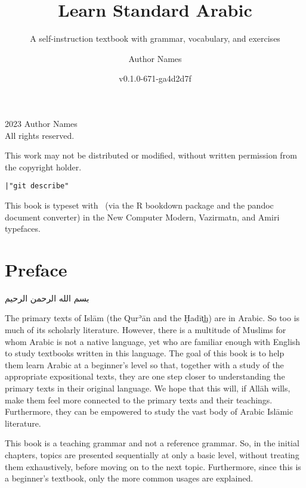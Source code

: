\documentclass[
  10pt,
]{book}
\title{Learn Standard Arabic}
\subtitle{A self-instruction textbook with grammar, vocabulary, and exercises}
\author{Author Names}
\date{v0.1.0-671-ga4d2d7f}
\newcommand{\gitTag}{|"git describe"}
\begin{document}
\maketitle

\thispagestyle{empty}
\begingroup
\footnotesize
\parindent 0pt
\parskip \baselineskip
\textcopyright{} 2023 Author Names \\
All rights reserved.

    This work may not be distributed or modified, without written permission from the copyright holder.

\texttt{\gitTag}

This book is typeset with \XeLaTeX\ (via the R bookdown package and the pandoc document converter)
in the New Computer Modern, Vazirmatn, and Amiri typefaces.


\vfill




\endgroup
\clearpage

{
\setcounter{tocdepth}{1}
\tableofcontents
}
\chapter*{Preface}\label{preface}


\foreignlanguage{arabic}{بسم الله الرحمن الرحيم}

The primary texts of Islām (the Qurʾān and the Ḥadīt͟h) are in Arabic. So too is much of its scholarly literature. However, there is a multitude of Muslims for whom Arabic is not a native language, yet who are familiar enough with English to study textbooks written in this language. The goal of this book is to help them learn Arabic at a beginner's level so that, together with a study of the appropriate expositional texts, they are one step closer to understanding the primary texts in their original language. We hope that this will, if Allāh wills, make them feel more connected to the primary texts and their teachings. Furthermore, they can be empowered to study the vast body of Arabic Islāmic literature.

This book is a teaching grammar and not a reference grammar. So, in the initial chapters, topics are presented sequentially at only a basic level, without treating them exhaustively, before moving on to the next topic. Furthermore, since this is a beginner's textbook, only the more common usages are explained.
\end{document}
